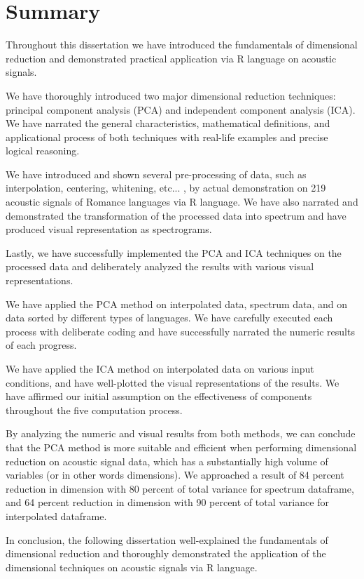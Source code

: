 \section{Summary}


Throughout this dissertation we have introduced the fundamentals of dimensional reduction and demonstrated practical application via R language on acoustic signals.

We have thoroughly introduced two major dimensional reduction techniques: principal component analysis (PCA) and independent component analysis (ICA). We have narrated the general characteristics, mathematical definitions, and applicational process of both techniques with real-life examples and precise logical reasoning.

We have introduced and shown several pre-processing of data, such as interpolation, centering, whitening, etc... , by actual demonstration on 219 acoustic signals of Romance languages via R language. We have also narrated and demonstrated the transformation of the processed data into spectrum and have produced visual representation as spectrograms.

Lastly, we have successfully implemented the PCA and ICA techniques on the processed data and deliberately analyzed the results with various visual representations. 

We have applied the PCA method on interpolated data, spectrum data, and on data sorted by different types of languages. We have carefully executed each process with deliberate coding and have successfully narrated the numeric results of each progress.

We have applied the ICA method on interpolated data on various input conditions, and have well-plotted the visual representations of the results. We have affirmed our initial assumption on the effectiveness of components throughout the five computation process.

By analyzing the numeric and visual results from both methods, we can conclude that the PCA method is more suitable and efficient when performing dimensional reduction on acoustic signal data, which has a substantially high volume of variables (or in other words dimensions). We approached a result of 84 percent reduction in dimension with 80 percent of total variance for spectrum dataframe, and 64 percent reduction in dimension with 90 percent of total variance for interpolated dataframe.

In conclusion, the following dissertation well-explained the fundamentals of dimensional reduction and thoroughly demonstrated the application of the dimensional techniques on acoustic signals via R language.



